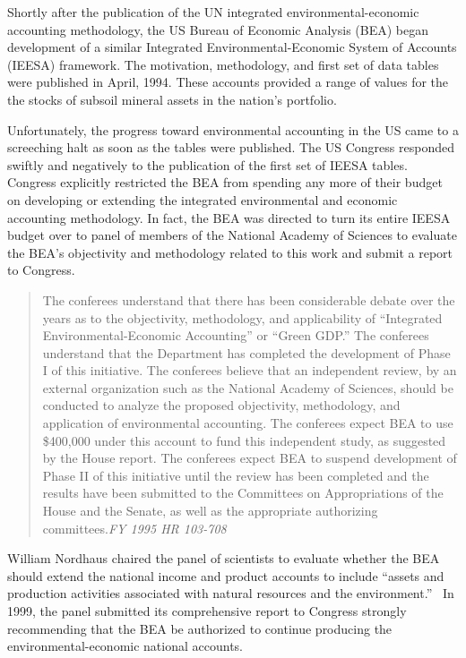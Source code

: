 Shortly after the publication 
of the UN integrated environmental-economic accounting methodology, 
the US Bureau of Economic Analysis (BEA) began development of a similar
Integrated Environmental-Economic System of Accounts (IEESA) framework. 
The motivation, methodology, and first set of data tables were published 
in April, 1994.\cite{BEA1994a} 
These accounts provided a range of values 
for the the stocks of subsoil mineral assets in the nation’s portfolio. 

Unfortunately, the progress toward environmental accounting 
in the US came to a screeching halt as soon as the tables were published. 
The US Congress responded swiftly and negatively 
to the publication of the first set of IEESA tables. 
Congress explicitly restricted the BEA from spending any more 
of their budget on developing or extending 
the integrated environmental and economic accounting methodology. 
In fact, the BEA was directed 
to turn its entire IEESA budget over to panel 
of members of the National Academy of Sciences 
to evaluate the BEA’s objectivity and methodology 
related to this work and submit a report to Congress.

\begin{quote}
The conferees understand that there has been considerable debate 
over the years as to the objectivity, methodology, and applicability 
of ``Integrated Environmental-Economic Accounting'' or ``Green GDP.''
The conferees understand that the Department 
has completed the development of Phase I of this initiative. 
The conferees believe that an independent review, 
by an external organization such as the National Academy of Sciences, 
should be conducted to analyze 
the proposed objectivity, methodology, and application of environmental accounting. 
The conferees expect BEA to use \$400,000 under this account 
to fund this independent study, as suggested by the House report. 
The conferees expect BEA to suspend development 
of Phase II of this initiative 
until the review has been completed and the results have been submitted 
to the Committees on Appropriations of the House and the Senate, 
as well as the appropriate authorizing committees.\emph{FY 1995 HR 103-708}
\end{quote}

William Nordhaus chaired the panel of scientists 
to evaluate whether the BEA should extend 
the national income and product accounts to include 
``assets and production activities associated 
with natural resources and the environment.''~\cite[p. 2]{ Nordhaus1999a} 
In 1999, the panel submitted its comprehensive report 
to Congress strongly recommending that the BEA be authorized 
to continue producing the environmental-economic national accounts.\cite{ Nordhaus1999a}

